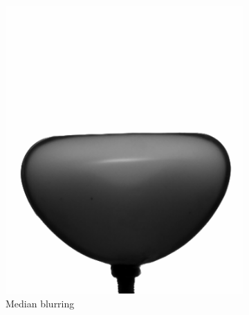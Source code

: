 \begin{figure}[H]%
	\centering%
	 \begin{subfigure}[h]{0.48\textwidth}%
        \includegraphics[width=\linewidth]{figures/Chapter_1/median_b.png}%
        \caption{Median blurring}%
				\label{fig:median_f}%
    \end{subfigure}%
    \begin{subfigure}[h]{0.48\textwidth}%

\end{subfigure}
\end{figure}

